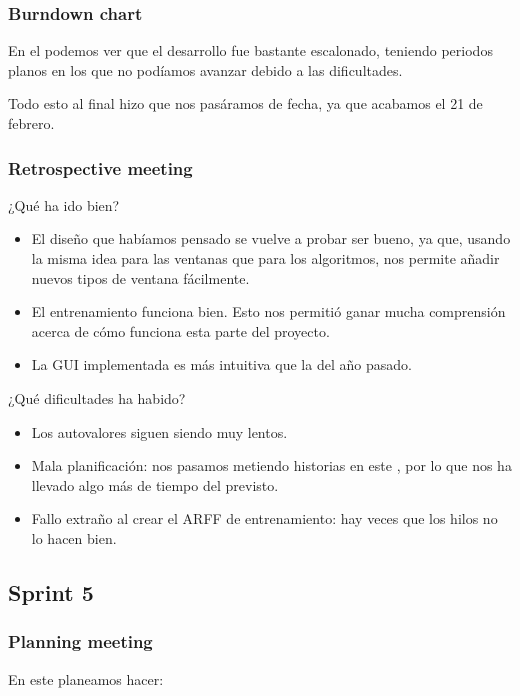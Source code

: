 \subsubsection*{Burndown chart}
En el \burndownchart{}  podemos ver que el desarrollo fue bastante escalonado, teniendo periodos planos en los que no podíamos avanzar debido a las dificultades.


Todo esto al final hizo que nos pasáramos de fecha, ya que acabamos el 21 de febrero.


\subsubsection*{Retrospective meeting}
¿Qué ha ido bien?
\begin{itemize}
 \item El diseño que habíamos pensado se vuelve a probar ser bueno, ya que, usando la misma idea para las ventanas que para los algoritmos, nos permite añadir nuevos tipos de ventana fácilmente.
 \item El entrenamiento funciona bien. Esto nos permitió ganar mucha comprensión acerca de cómo funciona esta parte del proyecto.
 \item La GUI implementada es más intuitiva que la del año pasado.
\end{itemize}

¿Qué dificultades ha habido?
\begin{itemize}
 \item Los autovalores siguen siendo muy lentos.
 \item Mala planificación: nos pasamos metiendo historias en este \sprint{}, por lo que nos ha llevado algo más de tiempo del previsto.
 \item Fallo extraño al crear el ARFF de entrenamiento: hay veces que los hilos no lo hacen bien.
\end{itemize}


\subsection{Sprint 5}
\subsubsection*{Planning meeting}
En este \sprint{} planeamos hacer:

